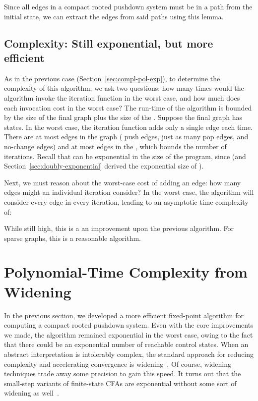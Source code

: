 Since all edges in a compact rooted pushdown system must be in a path from the initial state, we can extract the edges from said paths using this lemma.

\subsection{Complexity: Still exponential, but more efficient}

As in the previous case (Section~\ref{sec:compl-pol-exp}), to
determine the complexity of this algorithm, we ask two questions: how
many times would the algorithm invoke the iteration function in the
worst case, and how much does each invocation cost in the worst case?
The run-time of the algorithm is bounded by the size of the final
graph plus the size of the \ecg.
Suppose the final graph has  states.
In the worst case, the iteration function adds only a single edge each
time.
There are at most  edges in the graph ( push edges, just as many pop edges, and  no-change edges) and
at most  edges in the \ecg{}, which bounds the number of
iterations.
Recall that  can be exponential in the size of the program, since  (and Section~\ref{sec:doubly-exponential} derived the exponential size of ).

Next, we must reason about the worst-case cost of adding an edge: how
many edges might an individual iteration consider?
In the worst case, the algorithm will consider every edge in every
iteration, leading to an asymptotic time-complexity of:

While still high, this is a an improvement upon the previous
algorithm.  
For sparse graphs, this is a reasonable algorithm.




\section{Polynomial-Time Complexity from Widening}
\label{sec:widening}

In the previous section, we developed a more efficient fixed-point
algorithm for computing a compact rooted pushdown system.
Even with the core improvements we made, the algorithm remained
exponential in the worst case, owing to the fact that there could be
an exponential number of reachable control states.
When an abstract interpretation is intolerably complex, the standard
approach for reducing complexity and accelerating convergence is
widening~\cite{mattmight:Cousot:1977:AI}.
Of course, widening techniques trade away some precision to gain this
speed.
It turns out that the small-step variants of finite-state CFAs are
exponential without some sort of widening as
well~\cite{dvanhorn:VanHorn-Mairson:ICFP08}.


